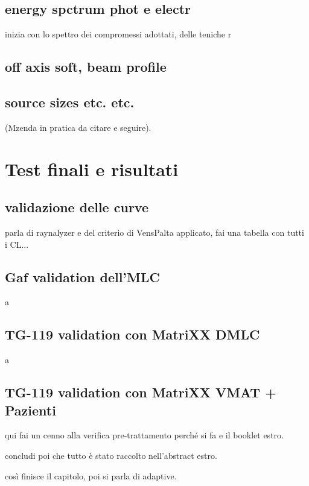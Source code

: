 \subsection{energy spctrum phot e electr}
inizia con lo spettro dei compromessi adottati, delle teniche r
\subsection{off axis soft, beam profile}
\subsection{source sizes etc. etc.}
(Mzenda in pratica da citare e seguire).


\section{Test finali e risultati}
\subsection{validazione delle curve}
parla di raynalyzer e del criterio di VensPalta applicato, fai una tabella con tutti i CL...
\subsection{Gaf validation dell'MLC}
a
\subsection{TG-119 validation con MatriXX DMLC}
a
\subsection{TG-119 validation con MatriXX VMAT + Pazienti}
qui fai un cenno alla verifica pre-trattamento perché si fa e il booklet estro.

concludi poi che tutto è stato raccolto nell'abstract estro.

così finisce il capitolo, poi si parla di adaptive.















